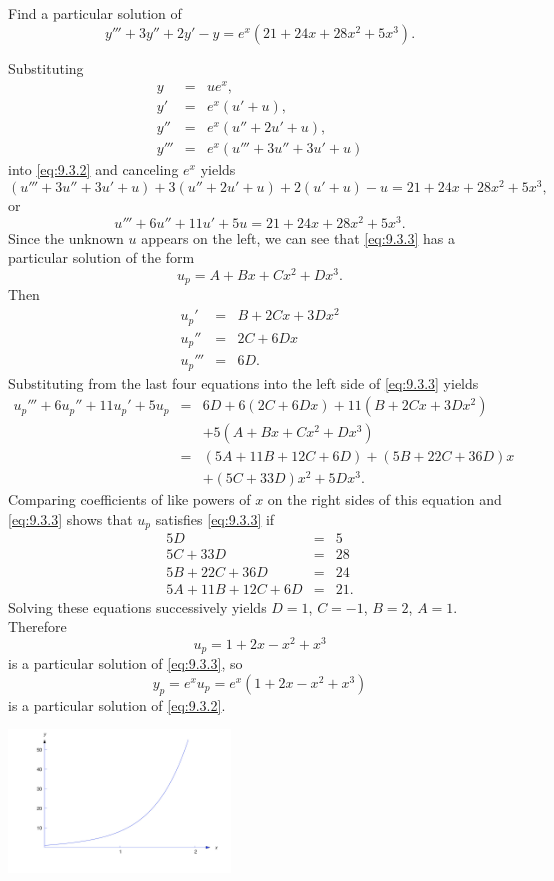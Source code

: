 \documentclass{ximera}
\begin{document}
\begin{example}\label{example:9.3.1}
Find a particular solution of
\begin{equation} \label{eq:9.3.2}
y'''+3y''+2y'-y=e^x(21+24x+28x^2+5x^3).
\end{equation}


\begin{explanation} Substituting
\begin{eqnarray*}
y&=&ue^x,\\ y'&=&e^x(u'+u),\\
y''&=&e^x(u''+2u'+u),\\
y'''&=&e^x(u'''+3u''+3u'+u)
\end{eqnarray*}
into \eqref{eq:9.3.2} and canceling $e^x$ yields
$$
(u'''+3u''+3u'+u)+3(u''+2u'+u)+2(u'+u)-u
=21+24x+28x^2+5x^3,
$$
or
\begin{equation} \label{eq:9.3.3}
u'''+6u''+11u'+5u=21+24x+28x^2+5x^3.
\end{equation}
Since the unknown $u$ appears on the left, we can see that
\eqref{eq:9.3.3} has a particular solution of the form
$$
u_p=A+Bx+Cx^2+Dx^3.
$$
Then
\begin{eqnarray*}
u_p'&=&B+2Cx+3Dx^2\\
u_p''&=&2C+6Dx\\
u_p'''&=&6D.
\end{eqnarray*}
Substituting from the last four equations  into the left side of
\eqref{eq:9.3.3} yields
\begin{eqnarray*}
u_p'''+6u_p''+11u_p'+5u_p&=&6D+6(2C+6Dx)+11(B+2Cx+3Dx^2)\\
&&+5(A+Bx+Cx^2+Dx^3)\\
&=&(5A+11B+12C+6D)+(5B+22C+36D)x\\&&+(5C+33D)x^2+5Dx^3.
\end{eqnarray*}
Comparing coefficients of like powers of $x$ on the right sides of
this equation and \eqref{eq:9.3.3} shows that $u_p$ satisfies \eqref{eq:9.3.3}
if
$$
\begin{array}{rcr}
5D&=&5\\
5C+33D&=&28\\
5B+22C+36D&=&24\\
5A+11B+12C+6D&=&21.
\end{array}
$$
Solving these equations successively yields $D=1$, $C=-1$, $B=2$, $A=1$.
Therefore
$$
u_p=1+2x-x^2+x^3
$$
is a particular solution of  \eqref{eq:9.3.3}, so
$$
y_p=e^xu_p=e^x(1+2x-x^2+x^3)
$$
is a particular solution of  \eqref{eq:9.3.2}.


\begin{image}
 \includegraphics[height=1.5in]{fig090301.jpg} 
\end{image}

\end{explanation}
\end{example}
\end{document}
